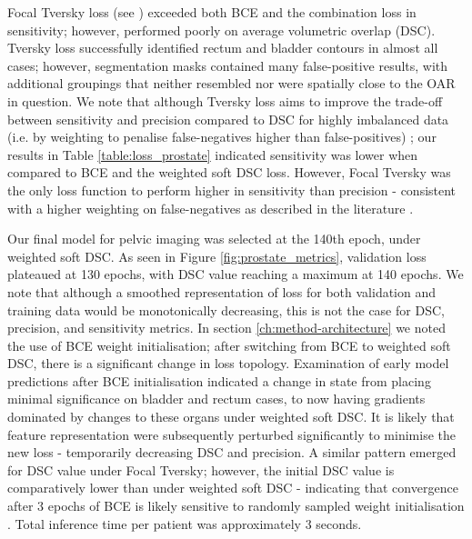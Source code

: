 Focal Tversky loss (see \cite{Khan2019}) exceeded both BCE and the combination loss in sensitivity; however, performed poorly on average volumetric overlap (DSC). Tversky loss successfully identified rectum and bladder contours in almost all cases; however, segmentation masks contained many false-positive results, with additional groupings that neither resembled nor were spatially close to the OAR in question. We note that although Tversky loss aims to improve the trade-off between sensitivity and precision compared to DSC for highly imbalanced data (i.e. by weighting to penalise false-negatives higher than false-positives) \cite{taghanaki2018}; our results in Table \ref{table:loss_prostate} indicated sensitivity was lower when compared to BCE and the weighted soft DSC loss. However, Focal Tversky was the only loss function to perform higher in sensitivity than precision - consistent with a higher weighting on false-negatives as described in the literature \cite{Khan2019}.



Our final model for pelvic imaging was selected at the 140th epoch, under weighted soft DSC. As seen in Figure \ref{fig:prostate_metrics}, validation loss plateaued at 130 epochs, with DSC value reaching a maximum at 140 epochs. We note that although a smoothed representation of loss for both validation and training data would be monotonically decreasing, this is not the case for DSC, precision, and sensitivity metrics. In section \ref{ch:method-architecture} we noted the use of BCE weight initialisation; after switching from BCE to weighted soft DSC, there is a significant change in loss topology. Examination of early model predictions after BCE initialisation indicated a change in state from placing minimal significance on bladder and rectum cases, to now having gradients dominated by changes to these organs under weighted soft DSC. It is likely that feature representation were subsequently perturbed significantly to minimise the new loss - temporarily decreasing DSC and precision. A similar pattern emerged for DSC value under Focal Tversky; however, the initial DSC value is comparatively lower than under weighted soft DSC - indicating that convergence after 3
epochs of BCE is likely sensitive to randomly sampled weight initialisation \cite{Ronneberger_2015}. Total inference time per patient was approximately 3 seconds.

